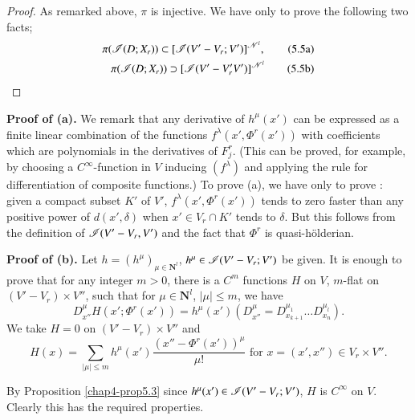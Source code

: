 \begin{proof}
  As remarked above, $\pi$ is injective. We have only to prove the following two facts;
  \begin{align*}
\pi (\mathscr{I} (D;X_r)) \subset [\mathscr{I} (V' - V_r; V')]^{\mathscr{N}^l},      \tag{5.5a} \label{chap4-eq5.5a}\\
\pi(\mathscr{I} (D; X_r)) \supset [\mathscr{I} (V' - V_r' V')]^{\mathscr{N}^l}      \tag{5.5b} \label{chap4-eq5.5b}
  \end{align*}
\end{proof}

\medskip
\noindent
\textbf{Proof of (a).} We remark that any derivative of $h^{\mu} (x')$ can be expressed as a finite linear combination of the functions $f^\lambda (x', \Phi^r (x'))$ with coefficients which are polynomials in the derivatives of $F^r_j$. (This can be proved, for example, by choosing a $C^\infty$-function in $V$ inducing $(f^\lambda)$ and applying the rule for differentiation of composite functions.) To prove (a), we have only to prove : given a compact subset $K'$ of $V'$, $f^\lambda (x', \Phi^r (x'))$ tends to zero faster than any positive power of $d(x',\delta)$ when $x' \in V_r \cap K'$ tends to $\delta$. But this follows from the definition of $\mathscr{I} (V' - V_r, V')$ and the fact that $\Phi^r$ is quasi-h\"olderian.

\medskip
\noindent
\textbf{Proof of (b).} Let $h = (h^\mu)_{\mu \in \mathbf{N}^l}$, $h^\mu \in \mathscr{I} (V' - V_r; V')$ be given. It is enough to prove that for any integer $m >0$, there is a $C^m$ functions $H$ on $V$, $m$-flat on $(V'- V_r) \times V''$, such that for $ \mu \in \mathbf{N}^l$, $|\mu | \leq m$, we have
$$
D^\mu_{x''} H  (x'; \Phi^r (x')) = h^\mu (x') (D^{\mu}_{x''} = D^{\mu_1}_{x_{k+1}} \ldots D^{\mu_l}_{x_n}). 
$$
We take $H=0$ on $(V'-V_r) \times V''$ and
$$
H(x) = \sum\limits_{|\mu| \leq m} h^\mu (x') \frac{(x'' - \Phi^r (x'))^\mu}{\mu!} \text{ for } x = (x' , x'') \in V_r \times V''.
$$

By Proposition \ref{chap4-prop5.3} since $h^\mu (x') \in \mathscr{I} (V' - V_r ; V')$, $H$ is $C^\infty$ on $V$. Clearly this has the required properties.


